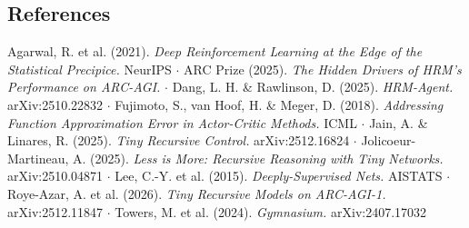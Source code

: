 \documentclass[11pt]{article}
\begin{document}
\subsection*{References}



Agarwal, R. et al. (2021). \emph{Deep Reinforcement Learning at the Edge of the Statistical Precipice.} NeurIPS $\cdot$ ARC Prize (2025). \emph{The Hidden Drivers of HRM's Performance on ARC-AGI.} $\cdot$ Dang, L. H. \& Rawlinson, D. (2025). \emph{HRM-Agent.} arXiv:2510.22832 $\cdot$ Fujimoto, S., van Hoof, H. \& Meger, D. (2018). \emph{Addressing Function Approximation Error in Actor-Critic Methods.} ICML $\cdot$ Jain, A. \& Linares, R. (2025). \emph{Tiny Recursive Control.} arXiv:2512.16824 $\cdot$ Jolicoeur-Martineau, A. (2025). \emph{Less is More: Recursive Reasoning with Tiny Networks.} arXiv:2510.04871 $\cdot$ Lee, C.-Y. et al. (2015). \emph{Deeply-Supervised Nets.} AISTATS $\cdot$ Roye-Azar, A. et al. (2026). \emph{Tiny Recursive Models on ARC-AGI-1.} arXiv:2512.11847 $\cdot$ Towers, M. et al. (2024). \emph{Gymnasium.} arXiv:2407.17032
\end{document}
